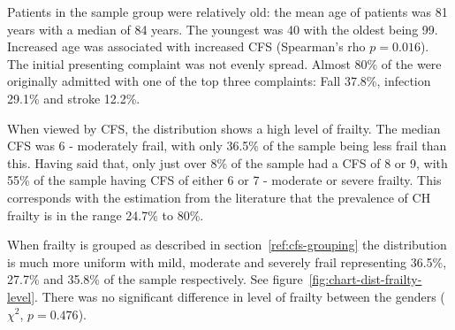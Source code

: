 \documentclass
[
	12pt,
	a4paper,
	oneside,
]{report}
\begin{document}
Patients in the sample group were relatively old: the mean age of patients was 
81 years with a median of 84 years. The youngest was 40 with the oldest being 
99. Increased age was associated with increased CFS (Spearman's rho
$p=0.016$). 
The initial presenting complaint was not evenly spread. Almost 80\% of the
were originally admitted with one of the top three complaints: Fall 37.8\%, 
infection 29.1\% and stroke 12.2\%. 

When viewed by CFS, the distribution shows a high level of frailty. The median 
CFS was 6 - moderately frail, with only 36.5\% of the sample being less frail
than this. Having said that, only just over 8\% of the sample had a CFS of 8
or 9, with 55\% of the sample having CFS of either 6 or 7 - moderate or
severe frailty. This corresponds with the estimation from the literature that 
the prevalence of CH frailty is in the range 24.7\% to 80\%.

When frailty is grouped as described in section~\ref{ref:cfs-grouping} the 
distribution is much more uniform with mild, moderate and severely frail
representing 36.5\%, 27.7\% and 35.8\% of the sample respectively.
See figure~\ref{fig:chart-dist-frailty-level}. There was no significant 
difference in level of frailty between the genders ($\chi^2$, $p=0.476$).
\label{sec:results-dist}
\end{document}
